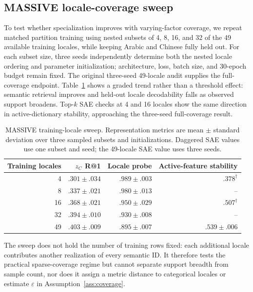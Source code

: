 \documentclass[11pt]{article}
\begin{document}
\subsection{MASSIVE locale-coverage sweep}
\label{app:coverage-sweep}
To test whether specialization improves with varying-factor coverage, we repeat matched partition training using nested subsets of 4, 8, 16, and 32 of the 49 available training locales, while keeping Arabic and Chinese fully held out. For each subset size, three seeds independently determine both the nested locale ordering and parameter initialization; architecture, loss, batch size, and 30-epoch budget remain fixed. The original three-seed 49-locale audit supplies the full-coverage endpoint. Table~\ref{tab:coverage-sweep} shows a graded trend rather than a threshold effect: semantic retrieval improves and held-out locale decodability falls as observed support broadens. Top-$k$ SAE checks at 4 and 16 locales show the same direction in active-dictionary stability, approaching the three-seed full-coverage result.

\begin{table}[H]
\centering\small
\caption{MASSIVE training-locale sweep. Representation metrics are mean $\pm$ standard deviation over three sampled subsets and initializations. Daggered SAE values use one subset and seed; the 49-locale SAE value uses three seeds.}
\label{tab:coverage-sweep}
\begin{tabular*}{\columnwidth}{@{\extracolsep{\fill}}rrrr@{}}
\toprule
Training locales & $z_C$ R@1 & Locale probe & Active-feature stability \\
\midrule
4  & $.301\pm.034$ & $.989\pm.003$ & $.378^{\dagger}$ \\
8  & $.337\pm.021$ & $.980\pm.013$ & -- \\
16 & $.368\pm.021$ & $.950\pm.029$ & $.507^{\dagger}$ \\
32 & $.394\pm.010$ & $.930\pm.008$ & -- \\
49 & $.403\pm.009$ & $.895\pm.007$ & $.539\pm.006$ \\
\bottomrule
\end{tabular*}
\end{table}

The sweep does not hold the number of training rows fixed: each additional locale contributes another realization of every semantic ID. It therefore tests the practical sparse-coverage regime but cannot separate support breadth from sample count, nor does it assign a metric distance to categorical locales or estimate $\varepsilon$ in Assumption~\ref{ass:coverage}.
\end{document}
